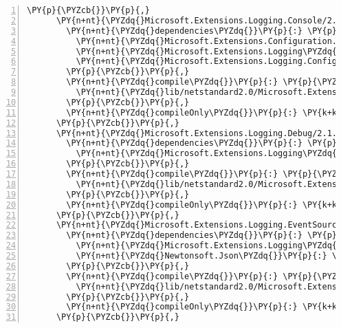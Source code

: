\begin{Verbatim}[commandchars=\\\{\},numbers=left,firstnumber=1,stepnumber=1,numberblanklines=0]
      \PY{p}{\PYZcb{}}\PY{p}{,}
      \PY{n+nt}{\PYZdq{}Microsoft.Extensions.Logging.Console/2.1.0\PYZhy{}rc1\PYZhy{}final\PYZdq{}}\PY{p}{:} \PY{p}{\PYZob{}}
        \PY{n+nt}{\PYZdq{}dependencies\PYZdq{}}\PY{p}{:} \PY{p}{\PYZob{}}
          \PY{n+nt}{\PYZdq{}Microsoft.Extensions.Configuration.Abstractions\PYZdq{}}\PY{p}{:} \PY{l+s+s2}{\PYZdq{}2.1.0\PYZhy{}rc1\PYZhy{}final\PYZdq{}}\PY{p}{,}
          \PY{n+nt}{\PYZdq{}Microsoft.Extensions.Logging\PYZdq{}}\PY{p}{:} \PY{l+s+s2}{\PYZdq{}2.1.0\PYZhy{}rc1\PYZhy{}final\PYZdq{}}\PY{p}{,}
          \PY{n+nt}{\PYZdq{}Microsoft.Extensions.Logging.Configuration\PYZdq{}}\PY{p}{:} \PY{l+s+s2}{\PYZdq{}2.1.0\PYZhy{}rc1\PYZhy{}final\PYZdq{}}
        \PY{p}{\PYZcb{}}\PY{p}{,}
        \PY{n+nt}{\PYZdq{}compile\PYZdq{}}\PY{p}{:} \PY{p}{\PYZob{}}
          \PY{n+nt}{\PYZdq{}lib/netstandard2.0/Microsoft.Extensions.Logging.Console.dll\PYZdq{}}\PY{p}{:} \PY{p}{\PYZob{}}\PY{p}{\PYZcb{}}
        \PY{p}{\PYZcb{}}\PY{p}{,}
        \PY{n+nt}{\PYZdq{}compileOnly\PYZdq{}}\PY{p}{:} \PY{k+kc}{true}
      \PY{p}{\PYZcb{}}\PY{p}{,}
      \PY{n+nt}{\PYZdq{}Microsoft.Extensions.Logging.Debug/2.1.0\PYZhy{}rc1\PYZhy{}final\PYZdq{}}\PY{p}{:} \PY{p}{\PYZob{}}
        \PY{n+nt}{\PYZdq{}dependencies\PYZdq{}}\PY{p}{:} \PY{p}{\PYZob{}}
          \PY{n+nt}{\PYZdq{}Microsoft.Extensions.Logging\PYZdq{}}\PY{p}{:} \PY{l+s+s2}{\PYZdq{}2.1.0\PYZhy{}rc1\PYZhy{}final\PYZdq{}}
        \PY{p}{\PYZcb{}}\PY{p}{,}
        \PY{n+nt}{\PYZdq{}compile\PYZdq{}}\PY{p}{:} \PY{p}{\PYZob{}}
          \PY{n+nt}{\PYZdq{}lib/netstandard2.0/Microsoft.Extensions.Logging.Debug.dll\PYZdq{}}\PY{p}{:} \PY{p}{\PYZob{}}\PY{p}{\PYZcb{}}
        \PY{p}{\PYZcb{}}\PY{p}{,}
        \PY{n+nt}{\PYZdq{}compileOnly\PYZdq{}}\PY{p}{:} \PY{k+kc}{true}
      \PY{p}{\PYZcb{}}\PY{p}{,}
      \PY{n+nt}{\PYZdq{}Microsoft.Extensions.Logging.EventSource/2.1.0\PYZhy{}rc1\PYZhy{}final\PYZdq{}}\PY{p}{:} \PY{p}{\PYZob{}}
        \PY{n+nt}{\PYZdq{}dependencies\PYZdq{}}\PY{p}{:} \PY{p}{\PYZob{}}
          \PY{n+nt}{\PYZdq{}Microsoft.Extensions.Logging\PYZdq{}}\PY{p}{:} \PY{l+s+s2}{\PYZdq{}2.1.0\PYZhy{}rc1\PYZhy{}final\PYZdq{}}\PY{p}{,}
          \PY{n+nt}{\PYZdq{}Newtonsoft.Json\PYZdq{}}\PY{p}{:} \PY{l+s+s2}{\PYZdq{}11.0.2\PYZdq{}}
        \PY{p}{\PYZcb{}}\PY{p}{,}
        \PY{n+nt}{\PYZdq{}compile\PYZdq{}}\PY{p}{:} \PY{p}{\PYZob{}}
          \PY{n+nt}{\PYZdq{}lib/netstandard2.0/Microsoft.Extensions.Logging.EventSource.dll\PYZdq{}}\PY{p}{:} \PY{p}{\PYZob{}}\PY{p}{\PYZcb{}}
        \PY{p}{\PYZcb{}}\PY{p}{,}
        \PY{n+nt}{\PYZdq{}compileOnly\PYZdq{}}\PY{p}{:} \PY{k+kc}{true}
      \PY{p}{\PYZcb{}}\PY{p}{,}

\end{Verbatim}
